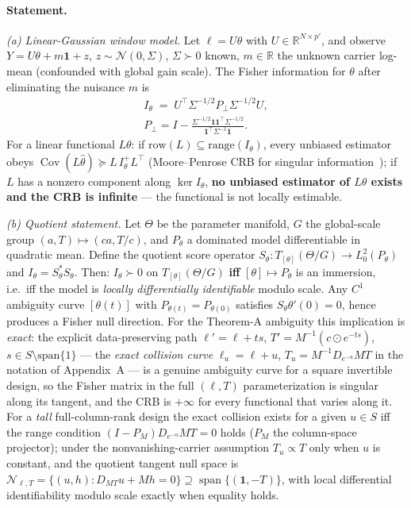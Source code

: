 \paragraph{Statement.} \emph{(a) Linear-Gaussian window model.} Let $\ell=U\theta$ with $U\in\mathbb R^{N\times p'}$, and observe $Y=U\theta+m\mathbf 1+z$, $z\sim\mathcal N(0,\Sigma)$, $\Sigma\succ0$ known, $m\in\mathbb R$ the unknown carrier log-mean (confounded with global gain scale). The Fisher information for $\theta$ after eliminating the nuisance $m$ is
\begin{equation}
\begin{gathered}
I_\theta\;=\;U^{\top}\Sigma^{-1/2}P_\perp\Sigma^{-1/2}U,\\
P_\perp=I-\frac{\Sigma^{-1/2}\mathbf 1\mathbf 1^{\top}\Sigma^{-1/2}}{\mathbf 1^{\top}\Sigma^{-1}\mathbf 1}.
\end{gathered}
\tag{D.7}
\end{equation}
For a linear functional $L\theta$: if $\mathrm{row}(L)\subseteq\mathrm{range}(I_\theta)$, every unbiased estimator obeys $\operatorname{Cov}(L\hat\theta)\succeq L\,I_\theta^{+}L^{\top}$ (Moore--Penrose CRB for singular information~\cite{RaoMitra1971,StoicaMarzetta2001}); if $L$ has a nonzero component along $\ker I_\theta$, \textbf{no unbiased estimator of $L\theta$ exists and the CRB is infinite} --- the functional is not locally estimable.

\emph{(b) Quotient statement.} Let $\Theta$ be the parameter manifold, $G$ the global-scale group $(a,T)\mapsto(ca,T/c)$, and $P_\theta$ a dominated model differentiable in quadratic mean. Define the quotient score operator $S_\theta:T_{[\theta]}(\Theta/G)\to L_0^2(P_\theta)$ and $I_\theta=S_\theta^{*}S_\theta$. Then: $I_\theta\succ0$ on $T_{[\theta]}(\Theta/G)$ \textbf{iff} $[\theta]\mapsto P_\theta$ is an immersion, i.e.\ iff the model is \emph{locally differentially identifiable} modulo scale. Any $C^1$ ambiguity curve $[\theta(t)]$ with $P_{\theta(t)}=P_{\theta(0)}$ satisfies $S_\theta\theta'(0)=0$, hence produces a Fisher null direction. For the Theorem-A ambiguity this implication is \emph{exact}: the explicit data-preserving path $\ell'=\ell+ts$, $T'=M^{-1}(c\odot e^{-ts})$, $s\in S\setminus\mathrm{span}\{1\}$ --- the \emph{exact collision curve} $\ell_u=\ell+u$, $T_u=M^{-1}D_{e^{-u}}MT$ in the notation of Appendix~A --- is a genuine ambiguity curve for a square invertible design, so the Fisher matrix in the full $(\ell,T)$ parameterization is singular along its tangent, and the CRB is $+\infty$ for every functional that varies along it. For a \emph{tall} full-column-rank design the exact collision exists for a given $u\in S$ iff the range condition $(I-P_M)D_{e^{-u}}MT=0$ holds ($P_M$ the column-space projector); under the nonvanishing-carrier assumption $T_u\propto T$ only when $u$ is constant, and the quotient tangent null space is $\mathcal N_{\ell,T}=\{(u,h):D_{MT}u+Mh=0\}\supseteq\operatorname{span}\{(\mathbf1,-T)\}$, with local differential identifiability modulo scale exactly when equality holds.

